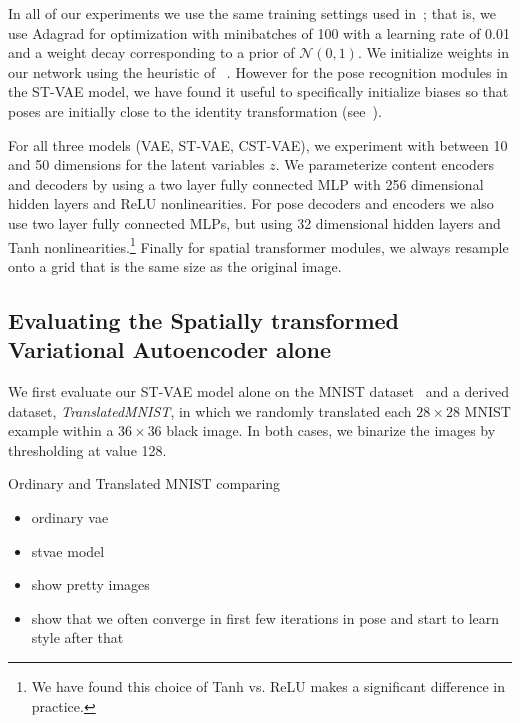 
In all of our experiments we use the same training settings used in~\cite{Kingma2014}; that is,  
we use Adagrad for optimization with minibatches of 100  with a learning rate of 0.01
and a weight decay corresponding to a prior of $\mathcal{N}(0,1)$.
We initialize weights in our network using the heuristic of ~\cite{glorot2010understanding}.
However for the pose recognition modules in the ST-VAE model, we have found it useful to
specifically initialize biases so that poses are initially close to the identity transformation (see~\cite{jaderberg2015spatial}).

For all three models (VAE, ST-VAE, CST-VAE),
we experiment with between 10 and 50  dimensions for the latent variables $z$.
We parameterize content encoders and decoders
by using a two layer fully connected MLP with 256 dimensional
hidden layers and ReLU nonlinearities.
For pose decoders and encoders we also use two layer fully connected MLPs, but 
using 32 dimensional hidden layers and Tanh nonlinearities.\footnote{
%
We have found this choice of Tanh vs. ReLU makes a significant
difference in practice.
}
Finally for spatial transformer modules, we always resample onto a grid that is the same size as the original
image.



\subsection{Evaluating the Spatially transformed Variational Autoencoder alone}

We first evaluate our ST-VAE model alone on the MNIST dataset~\citep{lecun1998gradient}
and a derived dataset, \emph{TranslatedMNIST}, in which we randomly translated each  $28\times 28$ MNIST example
within a $36\times 36$ black image.  In both cases, we binarize the images by thresholding at value 128.



Ordinary and Translated MNIST comparing
\begin{itemize}
\item ordinary vae
\item stvae model
\end{itemize}


\begin{itemize}
\item show pretty images
\item show that we often converge in first few iterations in pose and start to learn style after that
\end{itemize}



